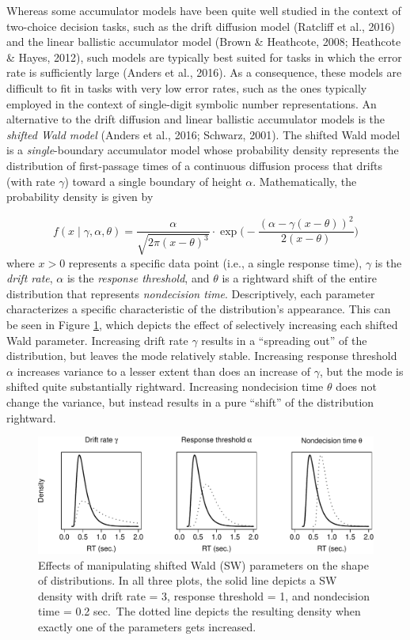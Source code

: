\documentclass[english,,man]{apa6}
\theoremstyle{definition}
\theoremstyle{definition}
\theoremstyle{definition}
\theoremstyle{remark}
\begin{document}
Whereas some accumulator models have been quite well studied in the
context of two-choice decision tasks, such as the drift diffusion model
(Ratcliff et al., 2016) and the linear ballistic accumulator model
(Brown \& Heathcote, 2008; Heathcote \& Hayes, 2012), such models are
typically best suited for tasks in which the error rate is sufficiently
large (Anders et al., 2016). As a consequence, these models are
difficult to fit in tasks with very low error rates, such as the ones
typically employed in the context of single-digit symbolic number
representations. An alternative to the drift diffusion and linear
ballistic accumulator models is the \emph{shifted Wald model} (Anders et
al., 2016; Schwarz, 2001). The shifted Wald model is a
\emph{single}-boundary accumulator model whose probability density
represents the distribution of first-passage times of a continuous
diffusion process that drifts (with rate \(\gamma\)) toward a single
boundary of height \(\alpha\). Mathematically, the probability density
is given by

\[
f(x \mid \gamma,\alpha,\theta) = \frac{\alpha}{\sqrt{2\pi(x-\theta)^3}}\cdot \exp\Biggl(-\frac{(\alpha-\gamma(x-\theta))^2}{2(x-\theta)}\Biggr)
\] where \(x>0\) represents a specific data point (i.e., a single
response time), \(\gamma\) is the \emph{drift rate}, \(\alpha\) is the
\emph{response threshold}, and \(\theta\) is a rightward shift of the
entire distribution that represents \emph{nondecision time}.
Descriptively, each parameter characterizes a specific characteristic of
the distribution's appearance. This can be seen in Figure
\ref{fig:swParameters}, which depicts the effect of selectively
increasing each shifted Wald parameter. Increasing drift rate \(\gamma\)
results in a \enquote{spreading out} of the distribution, but leaves the
mode relatively stable. Increasing response threshold \(\alpha\)
increases variance to a lesser extent than does an increase of
\(\gamma\), but the mode is shifted quite substantially rightward.
Increasing nondecision time \(\theta\) does not change the variance, but
instead results in a pure \enquote{shift} of the distribution rightward.

\begin{figure}
\centering
\includegraphics{paper_files/figure-latex/swParameters-1.pdf}
\caption{\label{fig:swParameters}Effects of manipulating shifted Wald (SW)
parameters on the shape of distributions. In all three plots, the solid
line depicts a SW density with drift rate = 3, response threshold = 1,
and nondecision time = 0.2 sec.~The dotted line depicts the resulting
density when exactly one of the parameters gets increased.}
\end{figure}
\end{document}
